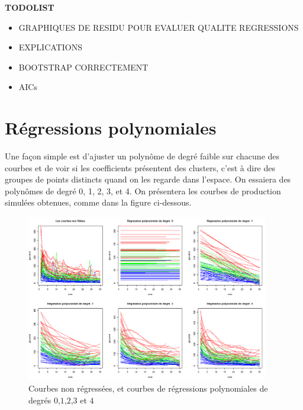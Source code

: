 \documentclass[12pt]{article}
\begin{document}
\small{
\tableofcontents 
}

\textbf{TODOLIST}
\begin{itemize}
	\item GRAPHIQUES DE RESIDU POUR EVALUER QUALITE REGRESSIONS
	\item EXPLICATIONS
	\item BOOTSTRAP CORRECTEMENT
	\item AICs
\end{itemize}

\newpage


\section{R\'egressions polynomiales}
\label{sec:reg_pol}

Une fa\c con simple est d'ajuster un polyn\^ome de degr\'e faible sur chacune des courbes et
de voir si les coefficients pr\'esentent des clusters, c'est \`a dire des groupes de points distincts
quand on les regarde dans l'espace.
On essaiera des polyn\^omes de degr\'e 0, 1, 2, 3, et 4.
On pr\'esentera les courbes de production simul\'ees obtenues, comme dans la figure ci-dessous.

 
\begin{figure}[H]
 \centering %
	\includegraphics[width=400px]{reg_pol}
  \caption{\label{fig:polynomial_regressions} Courbes non r\'egress\'ees, et courbes de r\'egressions polynomiales de degr\'es $0$,$1$,$2$,$3$ et $4$}
\end{figure}
\end{document}
